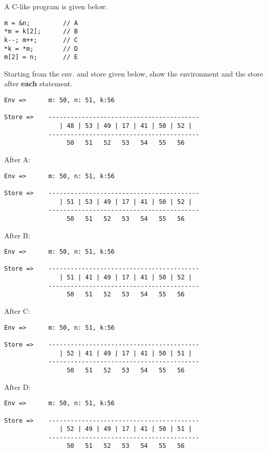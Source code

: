 \documentclass[addpoints]{exam}
\begin{document}
\begin{questions}
  \question
  A C-like program is given below.
  \begin{verbatim}
m = &n;         // A
*m = k[2];      // B
k--; m++;       // C
*k = *m;        // D
m[2] = n;       // E
  \end{verbatim}
  Starting from the env. and store given below,
  show the environment and the store 
  after \textbf{each} statement.
{\small
\begin{verbatim}
Env =>      m: 50, n: 51, k:56

Store =>    -----------------------------------------
               | 48 | 53 | 49 | 17 | 41 | 50 | 52 |  
            -----------------------------------------
                 50   51   52   53   54   55   56   
\end{verbatim}}


  \begin{solution}
After A:
{\small
\begin{verbatim}
Env =>      m: 50, n: 51, k:56

Store =>    -----------------------------------------
               | 51 | 53 | 49 | 17 | 41 | 50 | 52 |  
            -----------------------------------------
                 50   51   52   53   54   55   56   
\end{verbatim}}

After B:
{\small
\begin{verbatim}
Env =>      m: 50, n: 51, k:56

Store =>    -----------------------------------------
               | 51 | 41 | 49 | 17 | 41 | 50 | 52 |  
            -----------------------------------------
                 50   51   52   53   54   55   56   
\end{verbatim}}

After C:
{\small
\begin{verbatim}
Env =>      m: 50, n: 51, k:56

Store =>    -----------------------------------------
               | 52 | 41 | 49 | 17 | 41 | 50 | 51 |  
            -----------------------------------------
                 50   51   52   53   54   55   56   
\end{verbatim}}

After D:
{\small
\begin{verbatim}
Env =>      m: 50, n: 51, k:56

Store =>    -----------------------------------------
               | 52 | 49 | 49 | 17 | 41 | 50 | 51 |  
            -----------------------------------------
                 50   51   52   53   54   55   56   
\end{verbatim}}


\end{solution}
\end{questions}
\end{document}
